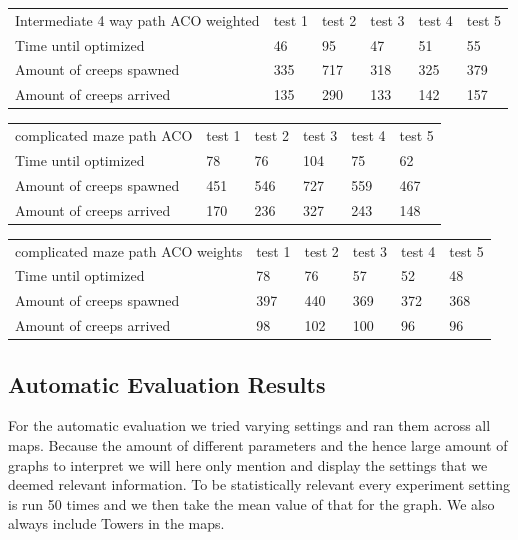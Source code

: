 \begin{table}
	\begin{tabular}{llllll}
		Intermediate 4 way path ACO weighted & test 1 & test 2 & test 3 & test 4 & test 5 \\
		Time until optimized                 & 46     & 95     & 47     & 51     & 55     \\
		Amount of creeps spawned             & 335    & 717    & 318    & 325    & 379    \\
		Amount of creeps arrived             & 135    & 290    & 133    & 142    & 157    \\
	\end{tabular}
\end{table}


\begin{table}
	\begin{tabular}{llllll}
		complicated maze path ACO & test 1 & test 2 & test 3 & test 4 & test 5 \\
		Time until optimized      & 78     & 76     & 104    & 75     & 62     \\
		Amount of creeps spawned  & 451    & 546    & 727    & 559    & 467    \\
		Amount of creeps arrived  & 170    & 236    & 327    & 243    & 148    \\
	\end{tabular}
\end{table}

\begin{table}
	\begin{tabular}{llllll}
		complicated maze path ACO weights & test 1 & test 2 & test 3 & test 4 & test 5 \\
		Time until optimized              & 78     & 76     & 57     & 52     & 48     \\
		Amount of creeps spawned          & 397    & 440    & 369    & 372    & 368    \\
		Amount of creeps arrived          & 98     & 102    & 100    & 96     & 96     \\
	\end{tabular}
\end{table}


\subsection{Automatic Evaluation Results}
\label{sec:autover}
For the automatic evaluation we tried varying settings and ran them across all maps. Because the amount of different parameters and the hence large amount of graphs to interpret we will here only mention and display the settings that we deemed relevant information. To be statistically relevant every experiment setting is run 50 times and we then take the mean value of that for the graph. We also always include Towers in the maps.

